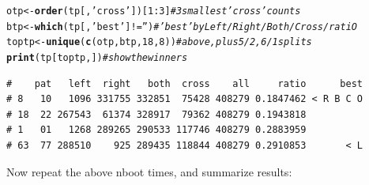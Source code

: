 \documentclass{article}\usepackage[]{graphicx}\usepackage[]{color}
\makeatletter
\newcommand{\hlnum}[1]{\textcolor[rgb]{0.686,0.059,0.569}{#1}}%
\newcommand{\hlstr}[1]{\textcolor[rgb]{0.192,0.494,0.8}{#1}}%
\newcommand{\hlcom}[1]{\textcolor[rgb]{0.678,0.584,0.686}{\textit{#1}}}%
\newcommand{\hlopt}[1]{\textcolor[rgb]{0,0,0}{#1}}%
\newcommand{\hlstd}[1]{\textcolor[rgb]{0.345,0.345,0.345}{#1}}%
\newcommand{\hlkwb}[1]{\textcolor[rgb]{0.69,0.353,0.396}{#1}}%
\newcommand{\hlkwd}[1]{\textcolor[rgb]{0.737,0.353,0.396}{\textbf{#1}}}%
\newenvironment{kframe}{%
 \def\at@end@of@kframe{}%
 \ifinner\ifhmode%
  \def\at@end@of@kframe{\end{minipage}}%
  \begin{minipage}{\columnwidth}%
 \fi\fi%
 \def\FrameCommand##1{\hskip\@totalleftmargin \hskip-\fboxsep
 \colorbox{shadecolor}{##1}\hskip-\fboxsep
     \hskip-\linewidth \hskip-\@totalleftmargin \hskip\columnwidth}%
 \MakeFramed {\advance\hsize-\width
   \@totalleftmargin\z@ \linewidth\hsize
   \@setminipage}}%
 {\par\unskip\endMakeFramed%
 \at@end@of@kframe}
\newenvironment{knitrout}{}{} %
\makeatother
\begin{document}
\begin{knitrout}\footnotesize
{}\color{fgcolor}\begin{kframe}
\begin{alltt}
\hlstd{otp} \hlkwb{<-} \hlkwd{order}\hlstd{(tp[,}\hlstr{'cross'}\hlstd{])[}\hlnum{1}\hlopt{:}\hlnum{3}\hlstd{]}    \hlcom{# 3 smallest 'cross' counts}
\hlstd{btp} \hlkwb{<-} \hlkwd{which}\hlstd{(tp[,}\hlstr{'best'}\hlstd{]} \hlopt{!=} \hlstr{''}\hlstd{)}    \hlcom{# 'best' by Left/Right/Both/Cross/ratiO}
\hlstd{toptp} \hlkwb{<-} \hlkwd{unique}\hlstd{(}\hlkwd{c}\hlstd{(otp,btp,}\hlnum{18}\hlstd{,}\hlnum{8}\hlstd{))}   \hlcom{# above, plus 5/2, 6/1 splits}
\hlkwd{print}\hlstd{(tp[toptp,])}                  \hlcom{# show the winners}
\end{alltt}
\begin{verbatim}
#    pat   left  right   both  cross    all     ratio      best
# 8   10   1096 331755 332851  75428 408279 0.1847462 < R B C O
# 18  22 267543  61374 328917  79362 408279 0.1943818          
# 1   01   1268 289265 290533 117746 408279 0.2883959          
# 63  77 288510    925 289435 118844 408279 0.2910853       < L
\end{verbatim}
\end{kframe}
\end{knitrout}

Now repeat the above nboot times, and summarize results:
\end{document}
